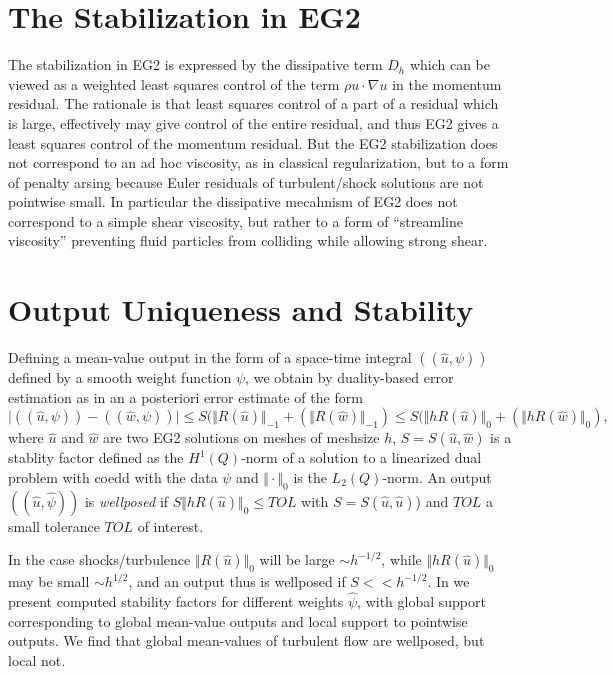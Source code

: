 \section{The Stabilization in EG2}

The stabilization in EG2 is expressed by the dissipative term $D_h$ 
which can be viewed as a weighted least squares control
of the term $\rho u\cdot\nabla u$ in the momentum residual.
The rationale is that least squares control of a  
part of a residual which is large, effectively may 
give control of the entire residual, and thus EG2 
gives a least squares control of the 
momentum residual. But the EG2 stabilization does not correspond
to an ad hoc viscosity, as in classical regularization, but to
a form of penalty arsing because Euler residuals 
of turbulent/shock solutions are not pointwise small. In particular
the dissipative mecahnism of EG2 does not correspond to a
simple shear viscosity, but rather to a form of ``streamline viscosity''
preventing fluid particles from colliding while allowing strong shear. 




\section{Output Uniqueness and Stability} 

Defining a mean-value output in the form of a space-time integral
$((\hat u,\psi ))$ defined by a smooth weight function $\psi$,
we obtain by duality-based error estimation as in 
\cite{ambsflow} an a posteriori error estimate 
of the form
\[
\vert ((\hat u,\psi ))- ((\hat w,\psi ))\vert\le S
(\Vert R(\hat u)\Vert_{-1}+(\Vert R(\hat w)\Vert_{-1})
\le S(\Vert h R(\hat u)\Vert_{0}+(\Vert h R(\hat w)\Vert_{0}) ,
\]
where $\hat u$ and $\hat w$ are 
two EG2 solutions on meshes of  meshsize $h$, $S=S(\hat u,\hat w)$ 
is a stablity factor defined as 
the $H^1(Q)$-norm of a solution to a linearized dual problem
with coedd
with the data $\psi$ and $\Vert\cdot\Vert_0$ is 
the $L_2(Q)$-norm. An output $((\hat u,\hat\psi ))$ is \emph{wellposed} 
if $S\Vert h R(\hat u)\Vert_{0}\le TOL$ 
with $S=S(\hat u,\hat u)$) and $TOL$ a small tolerance $TOL$ 
of interest.

In the case shocks/turbulence $\Vert R(\hat u)\Vert_0$ will be large
$\sim h^{-1/2}$, while $\Vert hR(\hat u)\Vert_0$ may be small $\sim
h^{1/2}$, and an output thus is wellposed if $S<<h^{-1/2}$.  In
\cite{ambsthermo} we present computed stability factors for different
weights $\hat\psi$, with global support corresponding to global
mean-value outputs and local support to pointwise outputs. We find
that global mean-values of turbulent flow are wellposed, but local
not.
